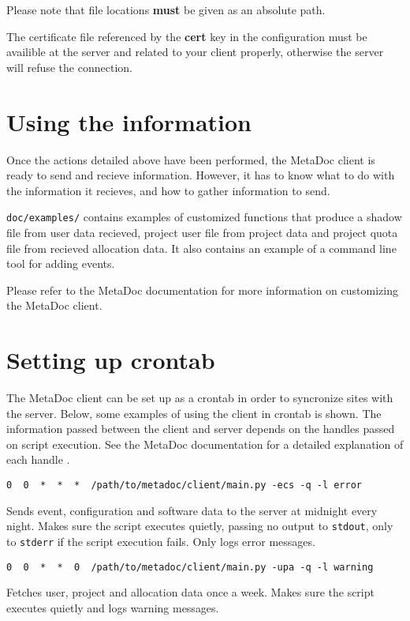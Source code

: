\documentclass[titlepage, a4paper,10pt]{article}
\begin{document}
Please note that file locations \textbf{must} be given as an absolute path.

The certificate file referenced by the \textbf{cert} key in the configuration
must be availible at the server and related to your client properly, otherwise
the server will refuse the connection.

\section{Using the information}
Once the actions detailed above have been performed, the MetaDoc client is
ready to send and recieve information. However, it has to know what to do with
the information it recieves, and how to gather information to send. 

\texttt{doc/examples/} contains examples of customized functions that produce a
shadow file from user data recieved, project user file from project data and
project quota file from recieved allocation data. It also contains an example
of a command line tool for adding events.

Please refer to the MetaDoc documentation \cite{mdoc} for more information on
customizing the MetaDoc client. 

\section{Setting up crontab}
The MetaDoc client can be set up as a crontab in order to syncronize sites with
the server. Below, some examples of using the client in crontab is shown. The
information passed between the client and server depends on the handles passed
on script execution. See the MetaDoc documentation for a detailed explanation
of each handle \cite{mdoc}.

\begin{verbatim}
0  0  *  *  *  /path/to/metadoc/client/main.py -ecs -q -l error
\end{verbatim}
Sends event, configuration and software data to the server at midnight every
night. Makes sure the script executes quietly, passing no output to
\texttt{stdout}, only to \texttt{stderr} if the script execution fails. Only
logs error messages.

\begin{verbatim}
0  0  *  *  0  /path/to/metadoc/client/main.py -upa -q -l warning
\end{verbatim}
Fetches user, project and allocation data once a week. Makes sure the script
executes quietly and logs warning messages.
\end{document}
